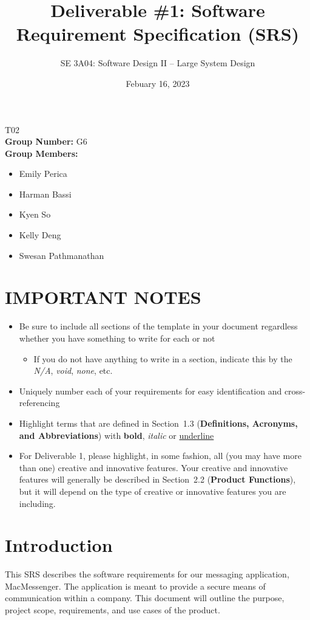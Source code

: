\documentclass[]{article}
\title{Deliverable \#1: Software Requirement Specification (SRS)}
\author{SE 3A04: Software Design II -- Large System Design}
\date{Febuary 16, 2023}
\begin{document}
\maketitle	
{} T02\\
{\bf Group Number:} G6 \\
{\bf Group Members:} 
\begin{itemize}
	\item Emily Perica
	\item Harman Bassi
    \item Kyen So
    \item Kelly Deng
    \item Swesan Pathmanathan 
\end{itemize}

\section*{IMPORTANT NOTES}
\begin{itemize}
	\item Be sure to include all sections of the template in your document regardless whether you have something to write for each or not
	\begin{itemize}
		\item If you do not have anything to write in a section, indicate this by the \emph{N/A}, \emph{void}, \emph{none}, etc.
	\end{itemize}
	\item Uniquely number each of your requirements for easy identification and cross-referencing
	\item Highlight terms that are defined in Section~1.3 (\textbf{Definitions, Acronyms, and Abbreviations}) with \textbf{bold}, \emph{italic} or \underline{underline}
	\item For Deliverable 1, please highlight, in some fashion, all (you may have more than one) creative and innovative features. Your creative and innovative features will generally be described in Section~2.2 (\textbf{Product Functions}), but it will depend on the type of creative or innovative features you are including.
\end{itemize}

\newpage
\section{Introduction}
\label{sec:introduction}

\hspace{5mm}This SRS describes the software requirements for our messaging application, MacMessenger. The application is meant to provide a secure means of communication within a company. This document will outline the purpose, project scope, requirements, and use cases of the product. \\
\end{document}
